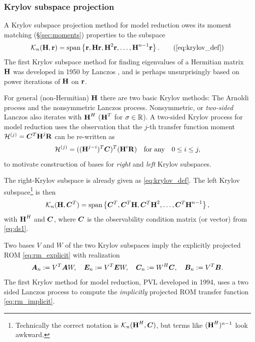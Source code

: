 \subsubsection{Krylov subspace projection}
A Krylov subspace projection method for model reduction owes its moment matching (\S\ref{sec:moments}) properties to the subspace  
\begin{equation}
          \krylov{n}{\H}{\Rr}= \spn \left\{\Rr, \H \Rr, \H^2\Rr,\ldots, \H^{n-1}\Rr\right\}.
          \tag{\ref{eq:krylov_def}}
      \end{equation}
  The first Krylov subspace method for finding eigenvalues of a Hermitian matrix $\textbf{\textup{H}}$ was developed in 1950 by Lanczos \cite{lanczos}, and is perhaps unsurprisingly based on power iterations of $\textbf{\textup{H}}$ on $\textbf{\textup{r}}$.  

For general (non-Hermitian) $\textbf{\textup{H}}$ there are two basic Krylov methods: The Arnoldi process and the nonsymmetric Lanczos process.   Nonsymmetric, or \emph{two-sided} Lanczos also iterates with $\textbf{\textup{H}}^H$ ($\textbf{\textup{H}}^T$ for $\sigma\in\mathbb{R}$).
A two-sided Krylov process for model reduction uses the observation that the $j$-th transfer function moment $\mathcal{H}^{(j)} = \bm{C}^T \textbf{\textup{H}}^j \textbf{\textup{R}}$ can be re-written as 
\begin{equation}
\mathcal{H}^{(j)} = ((\textbf{\textup{H}}^{j-i})^T\bm{C})^T(\textbf{\textup{H}}^i \textbf{\textup{R}}) \quad \text{for any} \quad
0\leq i \leq j,
\label{eq:dual_moment}
\end{equation}
to motivate construction of bases for \emph{right} and \emph{left} Krylov subspaces. 
 
 The right-Krylov subspace is already given as \eqref{eq:krylov_def}.  The left Krylov subspace\footnote{Technically the correct notation is $\mathcal{K}_{n}({\textbf{\textup{H}}^H},{\bm{C}})$, but terms like  $(\textbf{\textup{H}}^H)^{n-1}$  look awkward.}  is then 
\begin{equation}
          \mathcal{K}_{n}({\textbf{\textup{H}}},{\bm{C}^T})= \operatorname*{span} \left\{\bm{C}^T, \bm{C}^T\textbf{\textup{H}},  \bm{C}^T \textbf{\textup{H}}^2,\ldots, \bm{C}^T \textbf{\textup{H}}^{n-1} \right\} ,
          \label{eq:left_krylov_def}
      \end{equation}
with $\textbf{\textup{H}}^H$ and $\bm{C}$, where $\bm{C}$ is the observability condition matrix (or vector) from \eqref{eq:ds1}. 

 Two bases $V$ and $W$ of the two Krylov subspaces imply the explicitly projected ROM \eqref{eq:rm_explicit} with realization  
\begin{equation}
\bm{A}_n := V^T \bm{A} W, \quad \bm{E}_n := V^T \bm{E} W, \quad \bm{C}_n := W^H\bm{C}, \quad \bm{B}_n := V^T\bm{B}.
\label{eq:oblique_proj_ROM}
\end{equation}
The first Krylov method for model reduction, PVL \cite{PVL} developed in 1994, uses a two sided Lanczos process to compute the \emph{implicitly} projected ROM transfer function \eqref{eq:rm_implicit}. 



